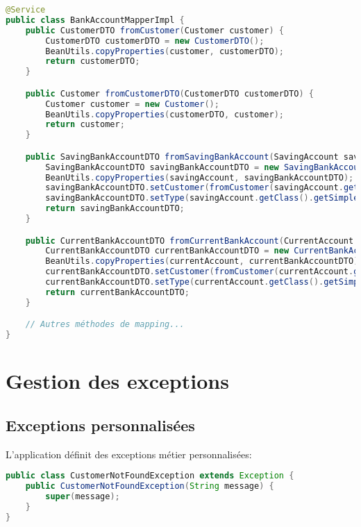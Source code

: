 \documentclass[12pt,a4paper]{report}
\begin{document}
\begin{lstlisting}[language=Java, caption=BankAccountMapperImpl.java]
@Service
public class BankAccountMapperImpl {
    public CustomerDTO fromCustomer(Customer customer) {
        CustomerDTO customerDTO = new CustomerDTO();
        BeanUtils.copyProperties(customer, customerDTO);
        return customerDTO;
    }

    public Customer fromCustomerDTO(CustomerDTO customerDTO) {
        Customer customer = new Customer();
        BeanUtils.copyProperties(customerDTO, customer);
        return customer;
    }

    public SavingBankAccountDTO fromSavingBankAccount(SavingAccount savingAccount) {
        SavingBankAccountDTO savingBankAccountDTO = new SavingBankAccountDTO();
        BeanUtils.copyProperties(savingAccount, savingBankAccountDTO);
        savingBankAccountDTO.setCustomer(fromCustomer(savingAccount.getCustomer()));
        savingBankAccountDTO.setType(savingAccount.getClass().getSimpleName());
        return savingBankAccountDTO;
    }

    public CurrentBankAccountDTO fromCurrentBankAccount(CurrentAccount currentAccount) {
        CurrentBankAccountDTO currentBankAccountDTO = new CurrentBankAccountDTO();
        BeanUtils.copyProperties(currentAccount, currentBankAccountDTO);
        currentBankAccountDTO.setCustomer(fromCustomer(currentAccount.getCustomer()));
        currentBankAccountDTO.setType(currentAccount.getClass().getSimpleName());
        return currentBankAccountDTO;
    }

    // Autres méthodes de mapping...
}
\end{lstlisting}

\chapter{Gestion des exceptions}
\section{Exceptions personnalisées}
L'application définit des exceptions métier personnalisées:

\begin{lstlisting}[language=Java, caption=CustomerNotFoundException.java]
public class CustomerNotFoundException extends Exception {
    public CustomerNotFoundException(String message) {
        super(message);
    }
}
\end{lstlisting}
\end{document}
